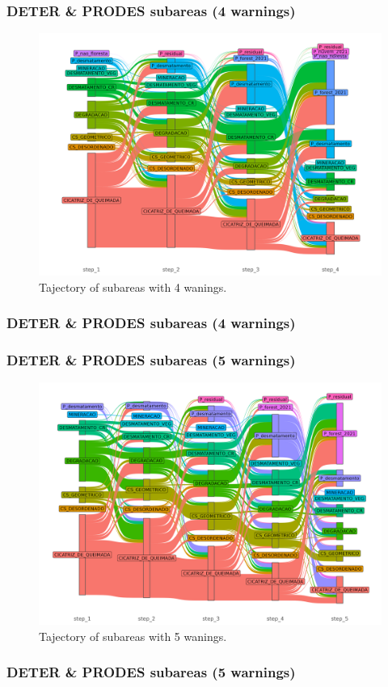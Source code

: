 \documentclass[aspectratio=169]{beamer}
\begin{document}
\begin{frame}
    \frametitle{DETER \& PRODES subareas (4 warnings)}
    \begin{figure}[h] 
        \includegraphics[width=0.65\linewidth]
        {./figures/plot_deter_prodes_subarea_trajectory_4.png}
        \caption{Tajectory of subareas with 4 wanings.}
        \label{fig:deter_prodes_subarea_trajectory_4}
    \end{figure}
\end{frame}
\begin{frame}[allowframebreaks]
    \frametitle{DETER \& PRODES subareas (4 warnings)}
    
\end{frame}


\begin{frame}
    \frametitle{DETER \& PRODES subareas (5 warnings)}
    \begin{figure}[h] 
        \includegraphics[width=0.65\linewidth]
        {./figures/plot_deter_prodes_subarea_trajectory_5.png}
        \caption{Tajectory of subareas with 5 wanings.}
        \label{fig:deter_prodes_subarea_trajectory_5}
    \end{figure}
\end{frame}
\begin{frame}[allowframebreaks]
    \frametitle{DETER \& PRODES subareas (5 warnings)}
    
\end{frame}
\end{document}
